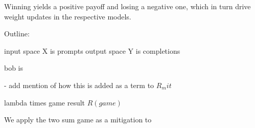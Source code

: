 Winning yields a positive payoff and losing a negative one, which in turn drive weight updates in the respective models.

Outline:

input space X is prompts output space Y is completions

bob is 

- add mention of how this is added as a term to $R_mit$

lambda times game result $R(game)$

We apply the two sum game as a mitigation to 

% 
%





